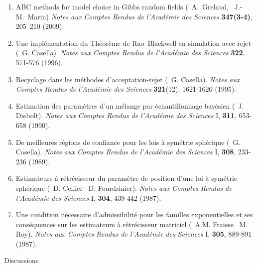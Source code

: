 \medskip
\begin{enumerate}
\renewcommand{\theenumi}{[N-\arabic{enumi}]}
\item ABC methods for model choice in Gibbs random fields (\avec\ A.~Grelaud, \et\  J.-M.~Marin)
{\em Notes aux Comptes Rendus de l'Acad\'emie des Sciences} {\bf 347(3-4)}, 205--210 (2009).

\item Une impl\'ementation du Th\'eor\`eme de Rao--Blackwell en simulation avec rejet (\avec\  G. Casella).
{\it Notes aux Comptes Rendus de l'Acad\'emie des Sciences} {\bf 322}, 571-576 (1996).

\item Recyclage dans les m\'ethodes d'acceptation-rejet (\avec\  G. Casella).
{\it Notes aux Comptes Rendus de l'Acad\'emie des Sciences} {\bf 321}(12), 
1621-1626 (1995).

\item Estimation des param\`etres d'un m\'elange par \'echantillonnage bay\'esien
(\avec\  J. Diebolt).  {\it Notes aux Comptes Rendus de l'Acad\'emie des 
Sciences\/} I, {\bf 311}, 653-658 (1990).

\item De meilleures r\'egions de confiance pour les lois \`a
sym\'etrie sph\'eri\-que (\avec\  G. Casella).
{\it Notes aux Comptes Rendus de l'Acad\'emie des Sciences\/}
I, {\bf 308}, 233-236 (1989).

\item Estimateurs \`a r\'etr\'ecisseur du param\`etre de
position d'une loi \`a sym\'etrie sph\'erique (\avec\  D. Cellier \et\ 
D. Fourdrinier). {\it Notes aux Comptes Rendus de l'Acad\'emie des
Sciences\/} I, {\bf 304}, 439-442 (1987). 
\item Une condition n\'ecessaire d'admissibilit\'e pour les familles 
exponentielles et ses cons\'equences sur les estimateurs \`a r\'etr\'ecisseur 
matriciel (\avec\  A.M. Fraisse \et\  M. Roy). {\it Notes aux Comptes Rendus de
l'Acad\'emie des Sciences\/} I, {\bf 305}, 889-891 (1987). 

\end{enumerate}
\bigskip
		\centerline{\sc Discussions}

